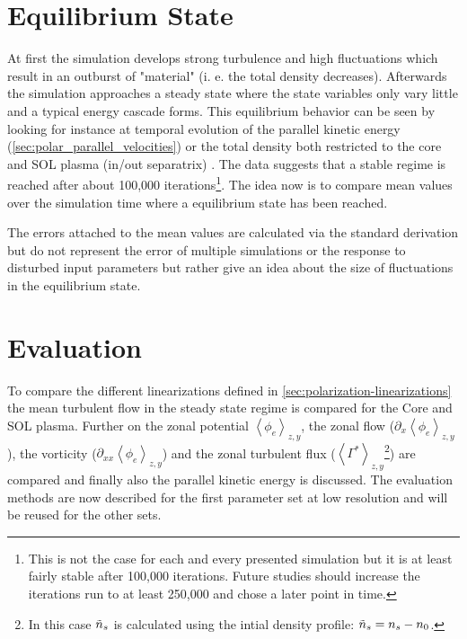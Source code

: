 \documentclass[master.tex]{subfiles}
\newcommand{\meanxy}[1]{\left<#1\right>_{z,y}}
\begin{document}
\section{Equilibrium State}
At first the simulation develops strong turbulence and high fluctuations which result in an outburst of "material" (i. e. the total density decreases). Afterwards the simulation approaches a steady state where the state variables only vary little and a typical energy cascade forms. This equilibrium behavior can be seen by looking for instance at temporal evolution of the parallel kinetic energy (\autoref{sec:polar_parallel_velocities}) or the total density both restricted to the core and \ac{SOL} plasma (in/out separatrix) . The data suggests that a stable regime is reached after about 100,000 iterations\footnote{This is not the case for each and every presented simulation but it is at least fairly stable after 100,000 iterations. Future studies should increase the iterations run to at least 250,000 and chose a later point in time.}. The idea now is to compare mean values over the simulation time where a equilibrium state has been reached. 



\begin{blockquote}
    The errors attached to the mean values are calculated via the standard derivation but do not represent the error of multiple simulations or the response to disturbed input parameters but rather give an idea about the size of fluctuations in the equilibrium state.
\end{blockquote}
    
\section{Evaluation}
To compare the different linearizations defined in \autoref{sec:polarization-linearizations} the mean turbulent flow in the steady state regime is compared for the Core and \ac{SOL} plasma. Further on the zonal potential  $\meanxy{\phi_e}$, the zonal flow ($\partial_x \meanxy{\phi_e}$), the vorticity ($\partial_{xx}\meanxy{\phi_e}$) and the zonal turbulent flux ($\left<\Gamma^*\right>_{z,y}$\footnote{In this case $\Tilde{n}_s$ is calculated using the intial density profile: $\Tilde{n}_s = n_s - n_0$.}) are compared and finally also the parallel kinetic energy is discussed. The evaluation methods are now described for the first parameter set at low resolution and will be reused for the other sets.
\end{document}
